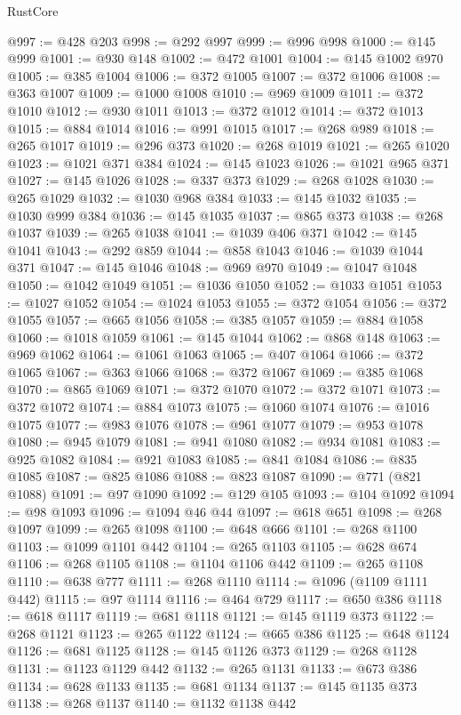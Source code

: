 \begin{lexlean}{RustCore}
\begin{coremodule}
@997 := @428 @203
@998 := @292 @997
@999 := @996 @998
@1000 := @145 @999
@1001 := @930 @148
@1002 := @472 @1001
@1004 := @145 @1002 @970
@1005 := @385 @1004
@1006 := @372 @1005
@1007 := @372 @1006
@1008 := @363 @1007
@1009 := @1000 @1008
@1010 := @969 @1009
@1011 := @372 @1010
@1012 := @930 @1011
@1013 := @372 @1012
@1014 := @372 @1013
@1015 := @884 @1014
@1016 := @991 @1015
@1017 := @268 @989
@1018 := @265 @1017
@1019 := @296 @373
@1020 := @268 @1019
@1021 := @265 @1020
@1023 := @1021 @371 @384
@1024 := @145 @1023
@1026 := @1021 @965 @371
@1027 := @145 @1026
@1028 := @337 @373
@1029 := @268 @1028
@1030 := @265 @1029
@1032 := @1030 @968 @384
@1033 := @145 @1032
@1035 := @1030 @999 @384
@1036 := @145 @1035
@1037 := @865 @373
@1038 := @268 @1037
@1039 := @265 @1038
@1041 := @1039 @406 @371
@1042 := @145 @1041
@1043 := @292 @859
@1044 := @858 @1043
@1046 := @1039 @1044 @371
@1047 := @145 @1046
@1048 := @969 @970
@1049 := @1047 @1048
@1050 := @1042 @1049
@1051 := @1036 @1050
@1052 := @1033 @1051
@1053 := @1027 @1052
@1054 := @1024 @1053
@1055 := @372 @1054
@1056 := @372 @1055
@1057 := @665 @1056
@1058 := @385 @1057
@1059 := @884 @1058
@1060 := @1018 @1059
@1061 := @145 @1044
@1062 := @868 @148
@1063 := @969 @1062
@1064 := @1061 @1063
@1065 := @407 @1064
@1066 := @372 @1065
@1067 := @363 @1066
@1068 := @372 @1067
@1069 := @385 @1068
@1070 := @865 @1069
@1071 := @372 @1070
@1072 := @372 @1071
@1073 := @372 @1072
@1074 := @884 @1073
@1075 := @1060 @1074
@1076 := @1016 @1075
@1077 := @983 @1076
@1078 := @961 @1077
@1079 := @953 @1078
@1080 := @945 @1079
@1081 := @941 @1080
@1082 := @934 @1081
@1083 := @925 @1082
@1084 := @921 @1083
@1085 := @841 @1084
@1086 := @835 @1085
@1087 := @825 @1086
@1088 := @823 @1087
@1090 := @771 (@821 @1088)
@1091 := @97 @1090
@1092 := @129 @105
@1093 := @104 @1092
@1094 := @98 @1093
@1096 := @1094 @46 @44
@1097 := @618 @651
@1098 := @268 @1097
@1099 := @265 @1098
@1100 := @648 @666
@1101 := @268 @1100
@1103 := @1099 @1101 @442
@1104 := @265 @1103
@1105 := @628 @674
@1106 := @268 @1105
@1108 := @1104 @1106 @442
@1109 := @265 @1108
@1110 := @638 @777
@1111 := @268 @1110
@1114 := @1096 (@1109 @1111 @442)
@1115 := @97 @1114
@1116 := @464 @729
@1117 := @650 @386
@1118 := @618 @1117
@1119 := @681 @1118
@1121 := @145 @1119 @373
@1122 := @268 @1121
@1123 := @265 @1122
@1124 := @665 @386
@1125 := @648 @1124
@1126 := @681 @1125
@1128 := @145 @1126 @373
@1129 := @268 @1128
@1131 := @1123 @1129 @442
@1132 := @265 @1131
@1133 := @673 @386
@1134 := @628 @1133
@1135 := @681 @1134
@1137 := @145 @1135 @373
@1138 := @268 @1137
@1140 := @1132 @1138 @442

\end{coremodule}
\end{lexlean}

